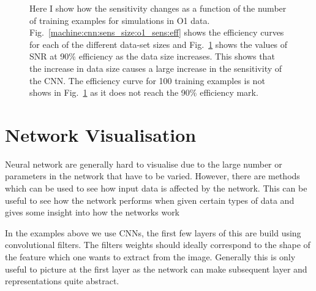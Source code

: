 \begin{figure}[h]
\begin{subfigure}[h]{0.5\textwidth}
		\label{machine:cnn:sens_size:o1_sens:train}
		\caption{}
	\end{subfigure}
	\caption{Here I show how the sensitivity changes as a function of the number of training examples for simulations in O1 data. Fig.~\ref{machine:cnn:sens_size:o1_sens:eff} shows the efficiency curves for each of the different data-set sizes and Fig.~\ref{machine:cnn:sens_size:o1_sens:train} shows the values of \ac{SNR} at 90\% efficiency as the data size increases. This shows that the increase in data size causes a large increase in the sensitivity of the \ac{CNN}. The efficiency curve for 100 training examples is not shows in Fig.~\ref{machine:cnn:sens_size:o1_sens:train} as it does not reach the 90\% efficiency mark.}
	\label{machine:cnn:sens_size:o1_sens}
\end{figure}



\section{\label{cnn:networkvis}Network Visualisation}

Neural network are generally hard to visualise due to the large number or parameters in the network that have to be varied.
However, there are methods which can be used to see how input data is affected by the network.
This can be useful to see how the network performs when given certain types of data and gives some insight into how the networks work

In the examples above we use \acp{CNN}, the first few layers of this are build using convolutional filters.
The filters weights should ideally correspond to the shape of the feature which one wants to extract from the image. 
Generally this is only useful to picture at the first layer as the network can make subsequent layer and representations quite abstract.



